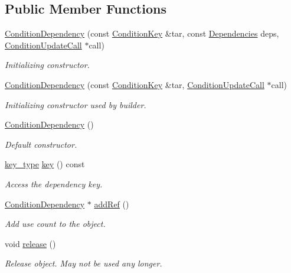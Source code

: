 \subsection*{Public Member Functions}
\begin{DoxyCompactItemize}
\item 
\hyperlink{class_d_d4hep_1_1_conditions_1_1_condition_dependency_aaf35fcc834e5ee49cc9d13fe9cff7ab5}{Condition\+Dependency} (const \hyperlink{class_d_d4hep_1_1_conditions_1_1_condition_key}{Condition\+Key} \&tar, const \hyperlink{class_d_d4hep_1_1_conditions_1_1_condition_dependency_af1594501f40e514c5748092b94e4fd84}{Dependencies} deps, \hyperlink{class_d_d4hep_1_1_conditions_1_1_condition_update_call}{Condition\+Update\+Call} $\ast$call)
\begin{DoxyCompactList}\small\item\em Initializing constructor. \end{DoxyCompactList}\item 
\hyperlink{class_d_d4hep_1_1_conditions_1_1_condition_dependency_aa3f6e8cb34ed2a24a07d6648668bf594}{Condition\+Dependency} (const \hyperlink{class_d_d4hep_1_1_conditions_1_1_condition_key}{Condition\+Key} \&tar, \hyperlink{class_d_d4hep_1_1_conditions_1_1_condition_update_call}{Condition\+Update\+Call} $\ast$call)
\begin{DoxyCompactList}\small\item\em Initializing constructor used by builder. \end{DoxyCompactList}\item 
\hyperlink{class_d_d4hep_1_1_conditions_1_1_condition_dependency_a9468a2ef21f829e7acf1569392ba2711}{Condition\+Dependency} ()
\begin{DoxyCompactList}\small\item\em Default constructor. \end{DoxyCompactList}\item 
\hyperlink{class_d_d4hep_1_1_conditions_1_1_condition_dependency_aeeb9606d1e1aae0a6eb4063ccfd1fca2}{key\+\_\+type} \hyperlink{class_d_d4hep_1_1_conditions_1_1_condition_dependency_a7c84c68d86ef440cb5d1735d26a218bb}{key} () const
\begin{DoxyCompactList}\small\item\em Access the dependency key. \end{DoxyCompactList}\item 
\hyperlink{class_d_d4hep_1_1_conditions_1_1_condition_dependency}{Condition\+Dependency} $\ast$ \hyperlink{class_d_d4hep_1_1_conditions_1_1_condition_dependency_a84b132a3ba867a4588d34e75e8fc297a}{add\+Ref} ()
\begin{DoxyCompactList}\small\item\em Add use count to the object. \end{DoxyCompactList}\item 
void \hyperlink{class_d_d4hep_1_1_conditions_1_1_condition_dependency_afdaaf31337b8f15156a1b8fad3895107}{release} ()
\begin{DoxyCompactList}\small\item\em Release object. May not be used any longer. \end{DoxyCompactList}\end{DoxyCompactItemize}
